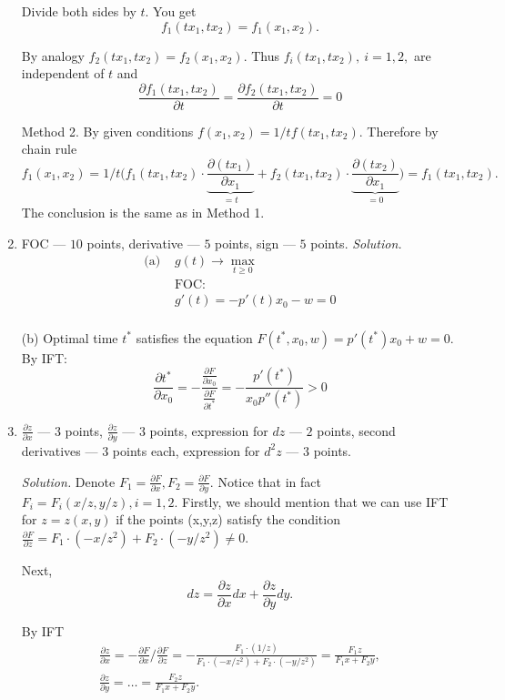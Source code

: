 \documentclass[12pt]{article} %
\theoremstyle{definition} %
\begin{document}
\begin{enumerate}
Divide both sides by $t.$ You get
$$
f_1(tx_1,tx_2) = f_1(x_1,x_2).
$$

By analogy $f_2(tx_1,tx_2) = f_2(x_1,x_2).$ Thus $f_i(tx_1,tx_2), \ i=1,2,$ are independent of $t$ and
\[
\frac{\partial f_1 (tx_1,tx_2)}{\partial t} = \frac{\partial f_2 (tx_1,tx_2)}{\partial t} = 0
\]

\noindent Method 2. By given conditions $f(x_1, x_2) = 1/t f(tx_1,tx_2).$ Therefore by chain rule
\[
f_1(x_1,x_2)=1/t \bigl(f_1 (tx_1,tx_2)\cdot\underbrace{\frac{\partial (tx_1)}{\partial x_1}}_{=t} +  f_2 (tx_1,tx_2)\cdot\underbrace{\frac{\partial (tx_2)}{\partial x_1}}_{=0}\bigr)=f_1(tx_1,tx_2).
\]
The conclusion is the same as in Method 1.


\item FOC --- $10$ points, derivative --- $5$ points, sign --- $5$ points.
\textit{Solution.}
\begin{equation*}
\begin{array}{ll}
\text{(a) }& g(t) \rightarrow \max_{t\geq0}\\
&\text{FOC:}\\
&g'(t) = -p'(t)x_0-w =0\\
\end{array}
\end{equation*}


(b) Optimal time $t^*$ satisfies the equation $F(t^*, x_0,w) = p'(t^*)x_0+w=0$. By IFT:
\begin{equation*}
\frac {\partial t^*}{\partial x_0} = - \frac {\frac {\partial F}{\partial x_0}} {\frac {\partial F}{\partial t^*}} = -\frac{p'(t^*)}{x_0p''(t^*)} > 0
\end{equation*}


\item $\frac{\partial z}{\partial x}$ --- $3$ points, $\frac{\partial z}{\partial y}$ --- $3$ points, expression for $dz$ --- $2$ points, second derivatives --- $3$ points each, expression for $d^2 z$ --- $3$ points.

\textit{Solution.} Denote $F_1 = \frac{\partial F}{\partial x}, F_2 = \frac{\partial F}{\partial y}.$ Notice that in fact $F_i=F_i(x/z,y/z), i=1,2.$
Firstly, we should mention that we can use IFT for $z=z(x,y)$ if the points (x,y,z) satisfy the condition $\frac{\partial F}{\partial z} = F_1 \cdot (-x/z^2)+ F_2 \cdot (-y/z^2)\neq 0.$

Next,
$$
dz = \frac{\partial z}{\partial x}dx+\frac{\partial z}{\partial y}dy.
$$

By IFT
\begin{gather*}
\frac{\partial z}{\partial x} = -\frac{\partial F}{\partial x}/\frac{\partial F}{\partial z} =-\frac{F_1\cdot (1/z)}{F_1\cdot(-x/z^2)+F_2\cdot(-y/z^2)}=\frac{F_1 z}{F_1 x+F_2 y}, \\ \frac{\partial z}{\partial y} =\dots= \frac{F_2 z}{F_1 x+F_2 y}.
\end{gather*}


\end{enumerate}
\end{document}
